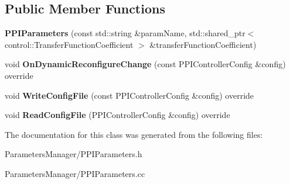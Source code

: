 \subsection*{Public Member Functions}
\begin{DoxyCompactItemize}
\item 
\mbox{\label{classproc__control_1_1_p_p_i_parameters_a87b8ca194a8b226c7a5ffac255394c86}} 
{\bfseries P\+P\+I\+Parameters} (const std\+::string \&param\+Name, std\+::shared\+\_\+ptr$<$ control\+::\+Transfer\+Function\+Coefficient $>$ \&transfer\+Function\+Coefficient)
\item 
\mbox{\label{classproc__control_1_1_p_p_i_parameters_aa9373a82f26917cedef0c36f9246174b}} 
void {\bfseries On\+Dynamic\+Reconfigure\+Change} (const P\+P\+I\+Controller\+Config \&config) override
\item 
\mbox{\label{classproc__control_1_1_p_p_i_parameters_a03b3e06540ea1e11796be7e1461842d9}} 
void {\bfseries Write\+Config\+File} (const P\+P\+I\+Controller\+Config \&config) override
\item 
\mbox{\label{classproc__control_1_1_p_p_i_parameters_aa6e22022871b0a7e6a972a20f757d6e3}} 
void {\bfseries Read\+Config\+File} (P\+P\+I\+Controller\+Config \&config) override
\end{DoxyCompactItemize}


The documentation for this class was generated from the following files\+:\begin{DoxyCompactItemize}
\item 
Parameters\+Manager/P\+P\+I\+Parameters.\+h\item 
Parameters\+Manager/P\+P\+I\+Parameters.\+cc\end{DoxyCompactItemize}
